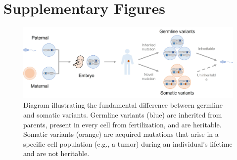 \documentclass[pdflatex,sn-nature]{sn-jnl}
\def\pandocbounded#1{%
  \begingroup
  \setkeys{Gin}{width=1.0\linewidth,height=1.0\textheight,keepaspectratio}%
  #1%
  \endgroup
}
\begin{document}
\section{Supplementary Figures}

\begin{figure}
	\centering
	\includegraphics[width=\linewidth]{page_3_cropped.jpg}
	\caption{Diagram illustrating the fundamental difference between germline and somatic variants. Germline variants (blue) are inherited from parents, present in every cell from fertilization, and are heritable. Somatic variants (orange) are acquired mutations that arise in a specific cell population (e.g., a tumor) during an individual's lifetime and are not heritable.}
	\label{fig:int-page-3-cropped-jpg}
\end{figure}
\end{document}
